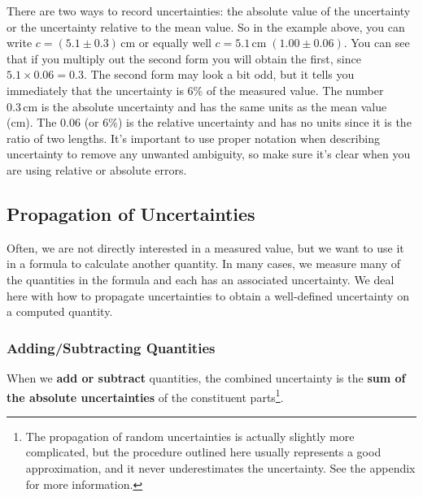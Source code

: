 There are two ways to record uncertainties: the absolute value of the uncertainty or the uncertainty relative to the mean value. So in the example above, you can write $c = (5.1 \pm 0.3)\,\mathrm{cm}$ or equally well $c = 5.1\,\mathrm{cm}\; (1.00 \pm 0.06)$. You can see that if you multiply out the second form you will obtain the first, since $5.1 \times 0.06 = 0.3$. The second form may look a bit odd, but it tells you immediately that the uncertainty is 6\% of the measured value. The number $0.3\,\mathrm{cm}$ is the absolute uncertainty and has the same units as the mean value (cm). The 0.06 (or 6\%) is the relative uncertainty and has no units since it is the ratio of two lengths. It's important to use proper notation when describing uncertainty to remove any unwanted ambiguity, so make sure it's clear when you are using relative or absolute errors.

\subsection{Propagation of Uncertainties}

Often, we are not directly interested in a measured value, but we want to use it in a formula to calculate another quantity. In many cases, we measure many of the quantities in the formula and each has an associated uncertainty. We deal here with how to propagate uncertainties to obtain a well-defined uncertainty on a computed quantity.

\subsubsection{Adding/Subtracting Quantities}

When we \textbf{add or subtract} quantities, the combined uncertainty is the \textbf{sum of the absolute uncertainties} of the constituent parts\footnote{The propagation of random uncertainties is actually slightly more complicated, but the procedure outlined here usually represents a good approximation, and it never underestimates the uncertainty. See the appendix for more information.}.

